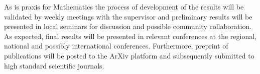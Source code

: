 As is praxis for Mathematics the process of development of the results will be validated by weekly meetings with the supervisor and preliminary results will be presented in local seminars for discussion and possible community collaboration. As expected, final results will be presented in relevant conferences at the regional, national and possibly international conferences. Furthermore, preprint of publications will be posted to the ArXiv platform and subsequently submitted to high standard scientific journals. 


